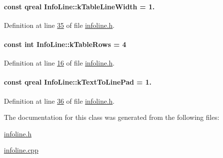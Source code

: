 \paragraph[{k\+Table\+Line\+Width}]{\setlength{\rightskip}{0pt plus 5cm}const qreal Info\+Line\+::k\+Table\+Line\+Width = 1.\hspace{0.3cm}{\ttfamily [static]}}\label{class_info_line_a9d03a53c9bca9357e502a1e423ff4541}


Definition at line \hyperlink{infoline_8h_source_l00035}{35} of file \hyperlink{infoline_8h_source}{infoline.\+h}.

\hypertarget{class_info_line_a95cdc7a95cde6db7c6faceda995d26b9}{}
\paragraph[{k\+Table\+Rows}]{\setlength{\rightskip}{0pt plus 5cm}const int Info\+Line\+::k\+Table\+Rows = 4\hspace{0.3cm}{\ttfamily [static]}}\label{class_info_line_a95cdc7a95cde6db7c6faceda995d26b9}


Definition at line \hyperlink{infoline_8h_source_l00016}{16} of file \hyperlink{infoline_8h_source}{infoline.\+h}.

\hypertarget{class_info_line_a858d0872a7e51d40ff6c87af5736db54}{}
\paragraph[{k\+Text\+To\+Line\+Pad}]{\setlength{\rightskip}{0pt plus 5cm}const qreal Info\+Line\+::k\+Text\+To\+Line\+Pad = 1.\hspace{0.3cm}{\ttfamily [static]}}\label{class_info_line_a858d0872a7e51d40ff6c87af5736db54}


Definition at line \hyperlink{infoline_8h_source_l00036}{36} of file \hyperlink{infoline_8h_source}{infoline.\+h}.



The documentation for this class was generated from the following files\+:\begin{DoxyCompactItemize}
\item 
\hyperlink{infoline_8h}{infoline.\+h}\item 
\hyperlink{infoline_8cpp}{infoline.\+cpp}\end{DoxyCompactItemize}
